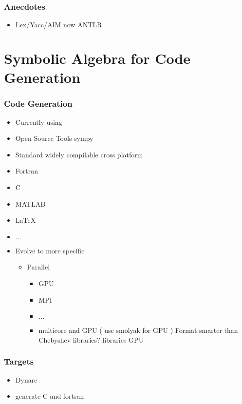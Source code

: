 \documentclass{beamer}
\begin{document}
\begin{frame}
  \frametitle{Anecdotes}
  \begin{itemize}
  \item Lex/Yacc/AIM  now  ANTLR
  \end{itemize}
\end{frame}


\section{Symbolic Algebra for Code Generation}

\begin{frame}
  \frametitle{ Code Generation}
  


\begin{itemize}

\item Currently using \mma
\item Open Source Tools  sympy 
\item Standard widely compilable cross platform
\item Fortran
\item C
\item MATLAB
\item \LaTeX
\item $\ldots$
\item Evolve to more specific
  \begin{itemize}
  \item Parallel
    \begin{itemize}
  \item GPU
  \item MPI
  \item $\ldots$
\item multicore and GPU ( use smolyak for GPU ) Format smarter than Chebyshev libraries?  libraries GPU
    \end{itemize}
  \end{itemize}
\end{itemize}

\end{frame}


\begin{frame}
  \frametitle{Targets}
  \begin{itemize}
  \item Dynare
\item generate C and fortran
  \end{itemize}
\end{frame}
\end{document}
